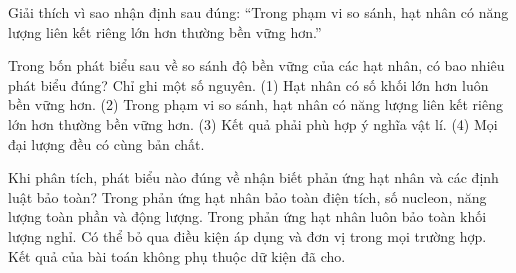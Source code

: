 \begin{bt}
Giải thích vì sao nhận định sau đúng: “Trong phạm vi so sánh, hạt nhân có năng lượng liên kết riêng lớn hơn thường bền vững hơn.”
\end{bt}

\begin{ex}
Trong bốn phát biểu sau về so sánh độ bền vững của các hạt nhân, có bao nhiêu phát biểu đúng? Chỉ ghi một số nguyên. (1) Hạt nhân có số khối lớn hơn luôn bền vững hơn. (2) Trong phạm vi so sánh, hạt nhân có năng lượng liên kết riêng lớn hơn thường bền vững hơn. (3) Kết quả phải phù hợp ý nghĩa vật lí. (4) Mọi đại lượng đều có cùng bản chất.
\end{ex}

\begin{ex}
Khi phân tích, phát biểu nào đúng về nhận biết phản ứng hạt nhân và các định luật bảo toàn?
\choice
{\True Trong phản ứng hạt nhân bảo toàn điện tích, số nucleon, năng lượng toàn phần và động lượng.}
{Trong phản ứng hạt nhân luôn bảo toàn khối lượng nghỉ.}
{Có thể bỏ qua điều kiện áp dụng và đơn vị trong mọi trường hợp.}
{Kết quả của bài toán không phụ thuộc dữ kiện đã cho.}
\end{ex}

